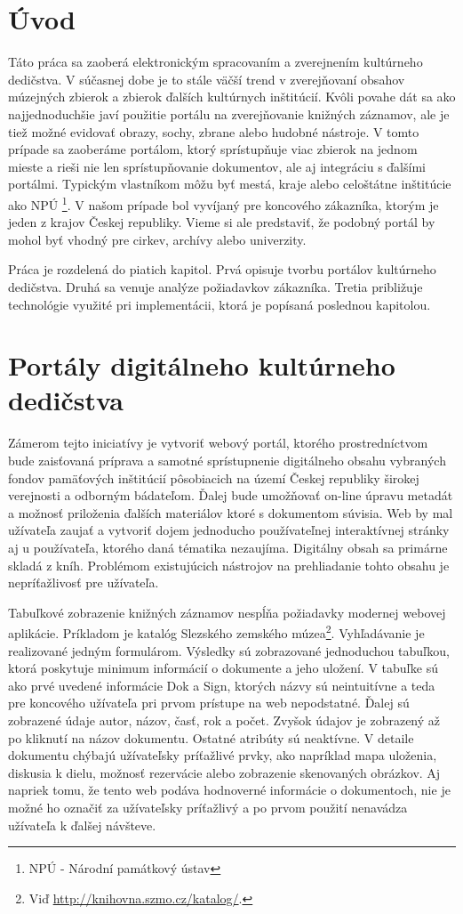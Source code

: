 \documentclass[
  print, %
  table,   %
  lof,     %
  nolot,     %
]{fithesis3}
\begin{document}
\chapter{Úvod}
Táto práca sa zaoberá elektronickým spracovaním a zverejnením kultúrneho dedičstva. V súčasnej dobe je to stále väčší trend v zverejňovaní obsahov múzejných zbierok a zbierok ďalších kultúrnych inštitúcií. Kvôli povahe dát sa ako najjednoduchšie javí použitie portálu na zverejňovanie knižných záznamov, ale je tiež možné evidovať obrazy, sochy, zbrane alebo hudobné nástroje. V tomto prípade sa zaoberáme portálom, ktorý sprístupňuje viac zbierok na jednom mieste a rieši nie len sprístupňovanie dokumentov, ale aj integráciu s ďalšími portálmi. Typickým vlastníkom môžu byť mestá, kraje alebo celoštátne inštitúcie ako NPÚ \footnote{NPÚ - Národní památkový ústav}. V našom prípade bol vyvíjaný pre koncového zákazníka, ktorým je jeden z krajov Českej republiky. Vieme si ale predstaviť, že podobný portál by mohol byť vhodný pre cirkev, archívy alebo univerzity.

Práca je rozdelená do piatich kapitol. Prvá opisuje tvorbu portálov kultúrneho dedičstva. Druhá sa venuje analýze požiadavkov zákazníka. Tretia približuje technológie využité pri implementácii, ktorá je popísaná poslednou kapitolou. 
\chapter{Portály digitálneho kultúrneho dedičstva}	
Zámerom tejto iniciatívy je vytvoriť webový portál, ktorého prostredníctvom bude zaisťovaná príprava a samotné sprístupnenie digitálneho obsahu vybraných fondov pamäťových inštitúcií pôsobiacich na území Českej republiky širokej verejnosti a odborným bádateľom. Ďalej bude umožňovať on-line úpravu metadát a možnosť priloženia ďalších materiálov ktoré s dokumentom súvisia. Web by mal užívateľa zaujať a vytvoriť dojem jednoducho používateľnej interaktívnej stránky aj u používateľa, ktorého daná tématika nezaujíma. Digitálny obsah sa primárne skladá z kníh. Problémom existujúcich nástrojov na prehliadanie tohto obsahu je nepríťažlivosť pre užívateľa. 

Tabuľkové zobrazenie knižných záznamov nespĺňa požiadavky modernej webovej aplikácie. Príkladom je katalóg Slezského zemského múzea\footnote{Viď \url{http://knihovna.szmo.cz/katalog/}.}. Vyhľadávanie je realizované jedným formulárom. Výsledky sú zobrazované jednoduchou tabuľkou, ktorá poskytuje minimum informácií o dokumente a jeho uložení. V tabuľke sú ako prvé uvedené informácie Dok a Sign, ktorých názvy sú neintuitívne a teda pre koncového užívateľa pri prvom prístupe na web nepodstatné. Ďalej sú zobrazené údaje autor, názov, časť, rok a počet. Zvyšok údajov je zobrazený až po kliknutí na názov dokumentu. Ostatné atribúty sú neaktívne. V detaile dokumentu chýbajú užívateľsky príťažlivé prvky, ako napríklad mapa uloženia, diskusia k dielu, možnosť rezervácie alebo zobrazenie skenovaných obrázkov. Aj napriek tomu, že tento web podáva hodnoverné informácie o dokumentoch, nie je možné ho označiť za užívateľsky príťažlivý a po prvom použití nenavádza užívateľa k ďalšej návšteve.
\end{document}
